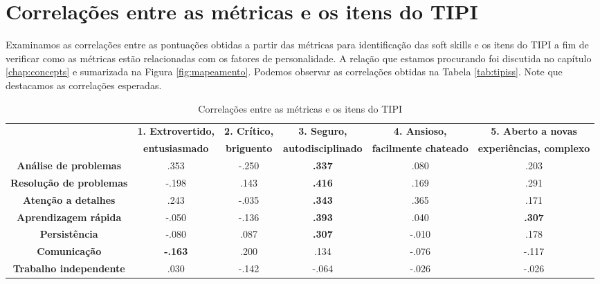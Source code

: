 \section{Correlações entre as métricas e os itens do TIPI}
\label{sec:tipiss}

Examinamos as correlações entre as pontuações obtidas a partir das métricas para identificação das soft skills e os itens do TIPI a fim de verificar como as métricas estão relacionadas com os fatores de personalidade. A relação que estamos procurando foi discutida no capítulo \ref{chap:concepts} e sumarizada na Figura \ref{fig:mapeamento}.
Podemos observar as correlações obtidas na Tabela \ref{tab:tipiss}. Note que destacamos as correlações esperadas. 

\begin{sidewaystable}[ph!]
\footnotesize
\caption{\small Correlações entre as métricas e os itens do TIPI}
\renewcommand{\arraystretch}{1.4} 
\centering
\begin{tabular}{lccccc}

    \toprule		
		& \textbf{1. Extrovertido, }  & \textbf{2. Crítico, } & \textbf{3. Seguro, } 			 & \textbf{4. Ansioso, } 				& \textbf{5. Aberto a novas } \\
		& \textbf{entusiasmado} 			& \textbf{briguento} 		& \textbf{autodisciplinado} & \textbf{facilmente chateado} & \textbf{experiências, complexo} \\
					
    \midrule
    \multicolumn{1}{c}{\textbf{Análise de problemas}} 		& .353  				 & -.250 & \textbf{.337} & .080  & .203 				 \\
    \multicolumn{1}{c}{\textbf{Resolução de problemas}}		& -.198  				 & .143  & \textbf{.416} & .169  & .291 				 \\
    \multicolumn{1}{c}{\textbf{Atenção a detalhes}} 			& .243  				 & -.035 & \textbf{.343} & .365  & .171 				 \\
    \multicolumn{1}{c}{\textbf{Aprendizagem rápida}} 			& -.050  				 & -.136 & \textbf{.393} & .040  & \textbf{.307} \\
    \multicolumn{1}{c}{\textbf{Persistência}} 						& -.080  				 & .087  & \textbf{.307} & -.010 & .178 				 \\
    \multicolumn{1}{c}{\textbf{Comunicação}} 							& \textbf{-.163} & .200  & .134  			   & -.076 & -.117 				 \\
    \multicolumn{1}{c}{\textbf{Trabalho independente}} 		& .030  				 & -.142 & -.064 				 & -.026 & -.026 				 \\ 
		

\end{tabular}
\end{sidewaystable}
